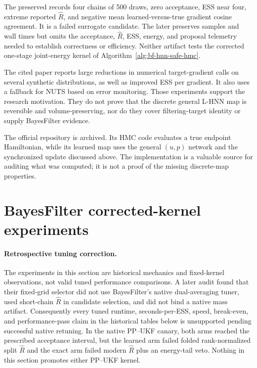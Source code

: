The preserved  records four chains of 500 draws,
zero acceptance, ESS near four, extreme reported $\widehat R$, and negative
mean learned-versus-true gradient cosine agreement.  It is a failed surrogate
candidate.  The later  preserves samples and
wall times but omits the acceptance, $\widehat R$, ESS, energy, and proposal
telemetry needed to establish correctness or efficiency.  Neither artifact
tests the corrected one-stage joint-energy kernel of
Algorithm~\ref{alg:bf-hnn-safe-hmc}.

The cited paper reports large reductions in numerical target-gradient calls on
several synthetic distributions, as well as improved ESS per gradient.  It
also uses a fallback for NUTS based on error monitoring.  Those experiments
support the research motivation.  They do not prove that the discrete general
L-HNN map is reversible and volume-preserving, nor do they cover
filtering-target identity or supply BayesFilter evidence.

The official repository is archived.  Its HMC code evaluates a true endpoint
Hamiltonian, while its learned map uses the general $(u,p)$ network and the
synchronized update discussed above.  The implementation is a valuable source
for auditing what was computed; it is not a proof of the missing discrete-map
properties.

\section{BayesFilter corrected-kernel experiments}
\label{sec:bf-hnn-corrected-experiments}

\paragraph{Retrospective tuning correction.}
The experiments in this section are historical mechanics and fixed-kernel
observations, not valid tuned performance comparisons.  A later audit found
that their fixed-grid selector did not use BayesFilter's native dual-averaging
tuner, used short-chain $\widehat R$ in candidate selection, and did not bind a
native mass artifact.  Consequently every tuned runtime, seconds-per-ESS,
speed, break-even, and performance-pass claim in the historical tables below
is unsupported pending successful native retuning.  In the native PP--UKF
canary, both arms reached the prescribed acceptance interval, but the learned
arm failed folded rank-normalized split $\widehat R$ and the exact arm failed
modern $\widehat R$ plus an energy-tail veto.  Nothing in this section promotes
either PP--UKF kernel.

